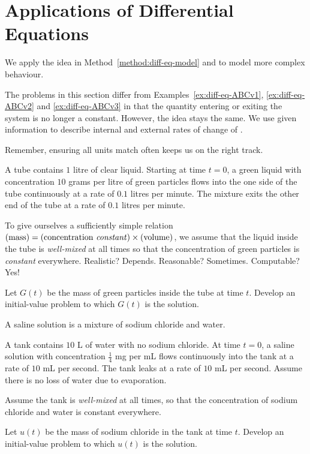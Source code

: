 \documentclass[../main.tex]{subfiles}
\begin{document}
 \section{Applications of Differential Equations}
We apply the idea in Method~\ref{method:diff-eq-model} and to model more complex behaviour. 

The problems in this section differ from Examples~\ref{ex:diff-eq-ABCv1}, \ref{ex:diff-eq-ABCv2} and \ref{ex:diff-eq-ABCv3} in that the quantity entering or exiting the system is no longer a constant. However, the idea stays the same. We use given information to describe internal and external rates of change of .

\faStar{} Remember, ensuring all units match often keeps us on the right track.

\begin{example}
  A tube contains \(1\) litre of clear liquid. Starting at time \(t = 0\), a green liquid with concentration \(10\) grams per litre of green particles flows into the one side of the tube continuously at a rate of \(0.1\) litres per minute.  The mixture exits the other end of the tube at a rate of \(0.1\) litres per minute.

  To give ourselves a sufficiently simple relation \((\text{mass}) = (\text{concentration \emph{constant}}) \times (\text{volume})\), we assume that the liquid inside the tube is \emph{well-mixed} at all times so that the concentration of green particles is \emph{constant} everywhere. Realistic? Depends. Reasonable? Sometimes. Computable? Yes!

  Let \(G(t)\) be the mass of green particles inside the tube at time \(t\). Develop an initial-value problem to which \(G(t)\) is the solution.
  
\end{example}
\clearpage

\begin{example} \label{ex:diff-eq-model-mixing-1}
  A saline solution is a mixture of sodium chloride and water. 

  A tank contains \(10\) L of water with no sodium chloride. At time \(t = 0\), a saline solution with concentration \(\tfrac{1}{4}\) mg per mL flows continuously into the tank at a rate of \(10\) mL per second. The tank leaks at a rate of \(10\) mL per second. Assume there is no loss of water due to evaporation.

  Assume the tank is \emph{well-mixed} at all times, so that the concentration of sodium chloride and water is constant everywhere. 

  Let \(u(t)\) be the mass of sodium chloride in the tank at time \(t\).  Develop an initial-value problem to which \(u(t)\) is the solution. 

\end{example}
\clearpage
\end{document}
